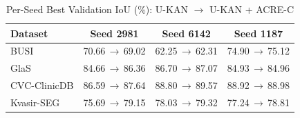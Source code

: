 \begin{table}[!t]
\caption{Per-Seed Best Validation IoU (\%): U-KAN $\rightarrow$ U-KAN + ACRE-C}
\label{tab:perseed}
\centering\footnotesize
\begin{tabular}{@{}lccc@{}}
\toprule
Dataset & Seed 2981 & Seed 6142 & Seed 1187 \\
\midrule
BUSI & 70.66$\,\rightarrow\,$69.02 & 62.25$\,\rightarrow\,$62.31 & 74.90$\,\rightarrow\,$75.12 \\
GlaS & 84.66$\,\rightarrow\,$86.36 & 86.70$\,\rightarrow\,$87.07 & 84.93$\,\rightarrow\,$84.96 \\
CVC-ClinicDB & 86.59$\,\rightarrow\,$87.64 & 88.80$\,\rightarrow\,$89.57 & 88.92$\,\rightarrow\,$88.98 \\
Kvasir-SEG & 75.69$\,\rightarrow\,$79.15 & 78.03$\,\rightarrow\,$79.32 & 77.24$\,\rightarrow\,$78.81 \\
\bottomrule
\end{tabular}
\end{table}
